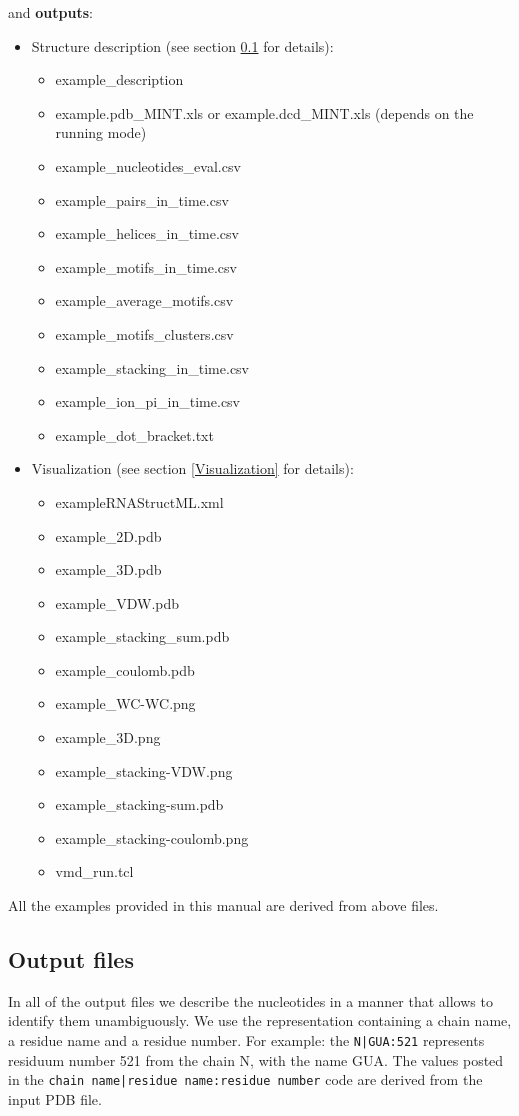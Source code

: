 \documentclass[12pt]{article}
\begin{document}
and \textbf{outputs}:
\begin{itemize}
\item Structure description (see section \ref{OutputFiles} for details):
\begin{itemize}
\item example\_description			
\item example.pdb\_MINT.xls or example.dcd\_MINT.xls (depends on the running mode)
\item example\_nucleotides\_eval.csv
\item example\_pairs\_in\_time.csv
\item example\_helices\_in\_time.csv
\item example\_motifs\_in\_time.csv
\item example\_average\_motifs.csv				
\item example\_motifs\_clusters.csv
\item example\_stacking\_in\_time.csv
\item example\_ion\_pi\_in\_time.csv
\item example\_dot\_bracket.txt
\end{itemize}
\item Visualization  (see section \ref{Visualization} for details):
\begin{itemize}
\item exampleRNAStructML.xml		
\item example\_2D.pdb				
\item example\_3D.pdb				
\item example\_VDW.pdb				
\item example\_stacking\_sum.pdb
\item example\_coulomb.pdb			
\item example\_WC-WC.png
\item example\_3D.png				
\item example\_stacking-VDW.png
\item example\_stacking-sum.pdb
\item example\_stacking-coulomb.png
\item vmd\_run.tcl
\end{itemize}
\end{itemize}

All the examples provided in this manual are derived from above files.

\subsection{Output files}\label{OutputFiles}
In all of the output files we describe the nucleotides in a manner that allows to identify them unambiguously. We use the representation containing a chain name, a residue name and a residue number. For example: the \texttt{N|GUA:521} represents residuum number 521 from the chain N, with the name GUA. The values posted in the \texttt{chain name|residue name:residue number} code are derived from the input PDB file.
\end{document}
